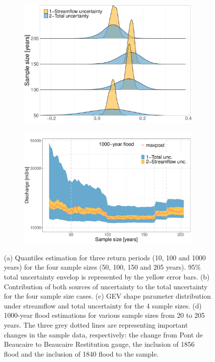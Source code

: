 \documentclass[11pt]{article}
\begin{document}
\begin{figure}[h!]
            \begin{subfigure}{0.49\textwidth}
                \centering
                \includegraphics[width=\linewidth]{Figs/11c-Shape_4cases.pdf}
                \caption{}
                \label{subfig:UKplot4cases}
            \end{subfigure}
            \begin{subfigure}{0.49\textwidth}
                \centering
                \includegraphics[width=\linewidth]{Figs/11d-Q1000SSize.pdf}
                \caption{}
                \label{subfig:SamplesQ1000}
            \end{subfigure}
            
            
        \caption{(a) Quantiles estimation for three return periods (10, 100 and 1000 years) for the four sample sizes (50, 100, 150 and 205 years). 95\% total uncertainty envelop is represented by the yellow error bars. 
        (b) Contribution of both sources of uncertainty to the total uncertainty for the four sample size cases. (c) GEV shape parameter distribution under streamflow and total uncertainty for the 4 sample sizes. (d) 1000-year flood estimations for various sample sizes from 20 to 205 years. The three grey dotted lines are representing important changes in the sample data, respectively: the change from Pont de Beaucaire to Beaucaire Restitution gauge, the inclusion of 1856 flood and the inclusion of 1840 flood to the sample.}
        \label{fig:Quantiles}
        \end{figure}
\end{document}
